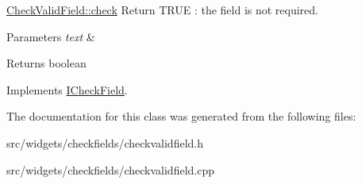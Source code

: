 \hyperlink{classCheckValidField_a192b1c9c84ea8897661425fd3c0b9e8e}{Check\+Valid\+Field\+::check} Return T\+R\+U\+E \+: the field is not required. 


\begin{DoxyParams}{Parameters}
{\em text} & \\
\hline
\end{DoxyParams}
\begin{DoxyReturn}{Returns}
boolean 
\end{DoxyReturn}


Implements \hyperlink{classICheckField_a6bd42b4d49c165cdd92822135123fd4b}{I\+Check\+Field}.



The documentation for this class was generated from the following files\+:\begin{DoxyCompactItemize}
\item 
src/widgets/checkfields/checkvalidfield.\+h\item 
src/widgets/checkfields/checkvalidfield.\+cpp\end{DoxyCompactItemize}
